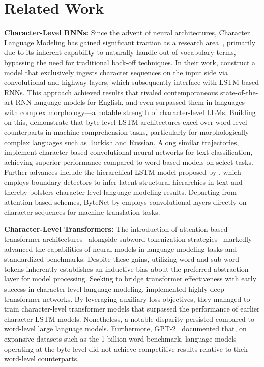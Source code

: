 \section{Related Work}
\label{section:related_work}

\textbf{Character-Level RNNs:} Since the advent of neural architectures, Character Language Modeling has gained significant traction as a research area~\citep{sutskever2011generating,mikolov2012subword,graves2013generating}, primarily due to its inherent capability to naturally handle out-of-vocabulary terms, bypassing the need for traditional back-off techniques. In their work, \cite{kim2016character} construct a model that exclusively ingests character sequences on the input side via convolutional and highway layers, which subsequently interface with LSTM-based RNNs. This approach achieved results that rivaled contemporaneous state-of-the-art RNN language models for English, and even surpassed them in languages with complex morphology—a notable strength of character-level LLMs. Building on this, \cite{kenter2018byte} demonstrate that byte-level LSTM architectures excel over word-level counterparts in machine comprehension tasks, particularly for morphologically complex languages such as Turkish and Russian. Along similar trajectories, \cite{zhang2015character} implement character-based convolutional neural networks for text classification, achieving superior performance compared to word-based models on select tasks. Further advances include the hierarchical LSTM model proposed by \citet{chung2019hierarchical}, which employs boundary detectors to infer latent structural hierarchies in text and thereby bolsters character-level language modeling results. Departing from attention-based schemes, ByteNet by \cite{kalchbrenner2016neural} employs convolutional layers directly on character sequences for machine translation tasks.

\textbf{Character-Level Transformers:} The introduction of attention-based transformer architectures~\citep{vaswani2017attention} alongside subword tokenization strategies~\citep{sennrich-etal-2016-neural} markedly advanced the capabilities of neural models in language modeling tasks and standardized benchmarks. Despite these gains, utilizing word and sub-word tokens inherently establishes an inductive bias about the preferred abstraction layer for model processing. Seeking to bridge transformer effectiveness with early success in character-level language modeling, \citet{al2019character} implemented highly deep transformer networks. By leveraging auxiliary loss objectives, they managed to train character-level transformer models that surpassed the performance of earlier character LSTM models. Nonetheless, a notable disparity persisted compared to word-level large language models. Furthermore, GPT-2~\citep{radfordgpt2} documented that, on expansive datasets such as the 1 billion word benchmark, language models operating at the byte level did not achieve competitive results relative to their word-level counterparts.

